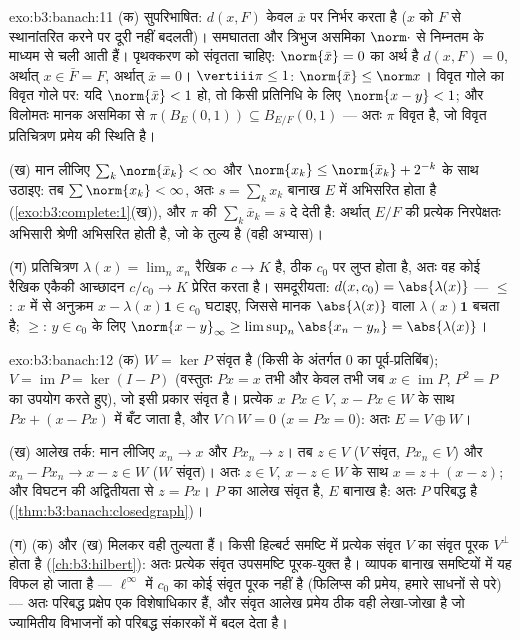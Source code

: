 \begin{solution}{exo:b3:banach:11}
(क) सुपरिभाषित: $d(x, F)$ केवल $\bar x$ पर निर्भर करता है ($x$ को $F$
से स्थानांतरित करने पर दूरी नहीं बदलती)। समघातता और त्रिभुज असमिका
$\norm\cdot$ से निम्नतम के माध्यम से चली आती हैं। पृथक्करण को संवृतता चाहिए:
$\norm{\bar
x} = 0$ का अर्थ है $d(x, F) = 0$, अर्थात् $x \in \bar F = F$, अर्थात् $\bar x = 0$। $\vertiii\pi \leq 1$: $\norm{\bar x} \leq
\norm x$।
विवृत गोले का विवृत गोले पर: यदि $\norm{\bar x} < 1$ हो, तो किसी प्रतिनिधि के लिए
$\norm{x - y} < 1$; और विलोमतः मानक असमिका से $\pi(B_E(0,1)) \subseteq B_{E/F}(0,1)$ --- अतः $\pi$ विवृत है, जो
विवृत प्रतिचित्रण प्रमेय की  स्थिति है।

(ख) मान लीजिए $\sum_k\norm{\bar x_k} < \infty$ और $\norm{x_k} \leq \norm{\bar x_k} + 2^{-k}$ के साथ उठाइए: तब $\sum\norm{x_k} < \infty$, अतः $s = \sum_kx_k$
बानाख $E$ में अभिसरित होता है (\cref{exo:b3:complete:1}(ख)), और $\pi$ की 
$\sum_k\bar x_k = \bar s$ दे देती है: अर्थात् $E/F$ की प्रत्येक निरपेक्षतः अभिसारी श्रेणी
अभिसरित होती है, जो  के तुल्य है (वही अभ्यास)।

(ग) प्रतिचित्रण $\lambda(x) = \lim_nx_n$ रैखिक $c \to K$ है, ठीक $c_0$ पर लुप्त होता है,
अतः वह कोई रैखिक एकैकी आच्छादन $c/c_0 \to K$ प्रेरित करता है। समदूरीयता:
$d(x, c_0) = \abs{\lambda(x)}$ --- $\leq$: $x$ में से अनुक्रम $x - \lambda(x)\mathbf
1 \in c_0$ घटाइए, जिससे मानक $\abs{\lambda(x)}$
वाला $\lambda(x)\mathbf 1$ बचता है; $\geq$: $y \in c_0$ के लिए $\norm{x -
y}_\infty \geq \limsup_n\abs{x_n - y_n} = \abs{\lambda(x)}$।
\end{solution}

\begin{solution}{exo:b3:banach:12}
(क) $W = \ker P$ संवृत है (किसी  के अंतर्गत $0$ का
पूर्व-प्रतिबिंब); $V = \operatorname{im}P = \ker(I - P)$ (वस्तुतः $Px = x$ तभी और केवल तभी जब $x \in \operatorname{im}P$,
$P^2 =
P$ का उपयोग करते हुए), जो इसी प्रकार संवृत है। प्रत्येक $x$
$Px \in V$, $x - Px \in W$ के साथ $Px + (x - Px)$ में बँट जाता है, और $V \cap W = 0$ ($x = Px
= 0$): अतः
$E = V \oplus W$।

(ख) आलेख तर्क: मान लीजिए $x_n \to x$ और $Px_n \to z$। तब $z \in V$ ($V$ संवृत,
$Px_n \in V$) और $x_n - Px_n \to
x - z \in W$ ($W$ संवृत)। अतः $z \in
V$, $x - z \in W$ के साथ $x = z + (x - z)$; और
विघटन की अद्वितीयता से $z =
Px$। $P$ का आलेख संवृत है, $E$ बानाख
है: अतः $P$ परिबद्ध है (\cref{thm:b3:banach:closedgraph})।

(ग) (क) और (ख) मिलकर वही तुल्यता हैं। किसी हिल्बर्ट समष्टि में
प्रत्येक संवृत $V$ का संवृत पूरक $V^\perp$ होता है (\cref{ch:b3:hilbert}): अतः प्रत्येक
संवृत उपसमष्टि पूरक-युक्त है। व्यापक बानाख समष्टियों में यह विफल हो
जाता है --- $\ell^\infty$ में $c_0$ का कोई संवृत पूरक नहीं है (फिलिप्स की
प्रमेय, हमारे साधनों से परे) --- अतः परिबद्ध प्रक्षेप एक विशेषाधिकार
हैं, और संवृत आलेख प्रमेय ठीक वही लेखा-जोखा है जो ज्यामितीय विभाजनों
को परिबद्ध संकारकों में बदल देता है।
\end{solution}

